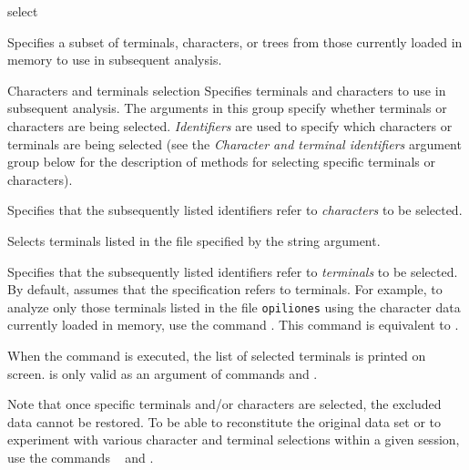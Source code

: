 \begin{command}{select}{}


	\begin{poydescription} 
            Specifies a subset of terminals, characters, or trees from those
            currently loaded in memory to use in subsequent analysis.
	\end{poydescription}
	

	\begin{arguments}
		
		\begin{argumentgroup}{Characters and terminals selection}
            {Specifies terminals and characters to use in subsequent
            analysis. 
            The arguments in this group specify whether terminals or characters
            are being selected.
            \emph{Identifiers} are used to specify which characters or
            terminals are being selected (see
            the \emph{Character and terminal identifiers} argument group below
            for the description of methods for selecting specific terminals or characters).}
 
                {Specifies that the subsequently listed identifiers
                refer to \emph{characters} to be selected.}
                {}

                {Selects terminals listed in the file specified by the string argument.}
                {}

                {Specifies that the subsequently listed identifiers
                refer to \emph{terminals} to be selected. By default, \poy
            assumes that the specification refers to terminals. For example, to
            analyze only those terminals listed in the file \texttt{opiliones} using
            the character data currently loaded in memory, use the command 
            . This  command is
            equivalent to .
            
            When the command is executed, the list of selected terminals is
            printed on screen.   is only valid as an
            argument of commands  and .} 
                {}
	
	\begin{statement}
  	Note that once specific terminals and/or  characters are selected, the excluded
	data cannot be restored. To be able to reconstitute the original data set or to
	experiment with various character and terminal selections within a given \poy
	session, use the commands ~ and .
	\end{statement}
	

\end{argumentgroup}
\end{arguments}
\end{command}
